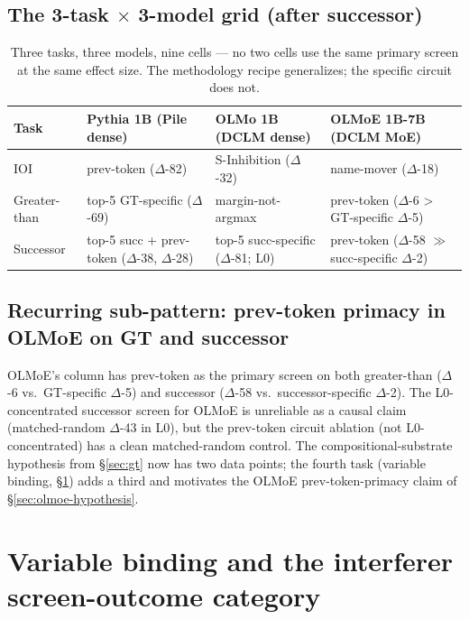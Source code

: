 \documentclass[11pt]{article}
\begin{document}
\subsection{The 3-task $\times$ 3-model grid (after successor)}

\begin{table}[h]
\centering
\small
\begin{tabular}{lp{3.5cm}p{3.5cm}p{4cm}}
\toprule
Task & Pythia 1B (Pile dense) & OLMo 1B (DCLM dense) & OLMoE 1B-7B (DCLM MoE) \\
\midrule
IOI & prev-token ($\Delta$-82) & S-Inhibition ($\Delta$-32) & name-mover ($\Delta$-18) \\
Greater-than & top-5 GT-specific ($\Delta$-69) & margin-not-argmax & prev-token ($\Delta$-6 > GT-specific $\Delta$-5) \\
Successor & top-5 succ + prev-token ($\Delta$-38, $\Delta$-28) & top-5 succ-specific ($\Delta$-81; L0) & prev-token ($\Delta$-58 $\gg$ succ-specific $\Delta$-2) \\
\bottomrule
\end{tabular}
\caption{Three tasks, three models, nine cells --- no two cells use the same primary screen at the same effect size. The methodology recipe generalizes; the specific circuit does not.}
\label{tab:three-task-grid}
\end{table}

\subsection{Recurring sub-pattern: prev-token primacy in OLMoE on GT and successor}

OLMoE's column has prev-token as the primary screen on both greater-than ($\Delta$-6 vs.\ GT-specific $\Delta$-5) and successor ($\Delta$-58 vs.\ successor-specific $\Delta$-2). The L0-concentrated successor screen for OLMoE is unreliable as a causal claim (matched-random $\Delta$-43 in L0), but the prev-token circuit ablation (not L0-concentrated) has a clean matched-random control. The compositional-substrate hypothesis from \S\ref{sec:gt} now has two data points; the fourth task (variable binding, \S\ref{sec:vb}) adds a third and motivates the OLMoE prev-token-primacy claim of \S\ref{sec:olmoe-hypothesis}.

\section{Variable binding and the interferer screen-outcome category}
\label{sec:vb}
\end{document}
